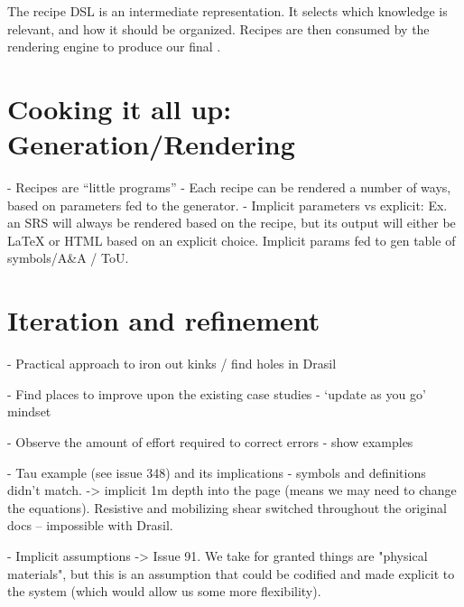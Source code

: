 The recipe DSL is an intermediate representation. It selects which 
knowledge is relevant, and how it should be organized. Recipes are then 
consumed by the rendering engine to produce our final \sfs{}.

\section{Cooking it all up: Generation/Rendering}
\label{sec:gen}
  - Recipes are “little programs”
  - Each recipe can be rendered a number of ways, based on parameters fed to the generator.
  -  Implicit parameters vs explicit: Ex. an SRS will always be rendered based on the recipe, but its output will either be LaTeX or HTML based on an explicit choice. Implicit params fed to gen table of symbols/A\&A / ToU.


\section{Iteration and refinement}

  - Practical approach to iron out kinks / find holes in Drasil

  - Find places to improve upon the existing case studies - ‘update as you go’ 
  mindset

  - Observe the amount of effort required to correct errors - show examples

  - Tau example (see issue 348) and its implications - symbols and definitions 
  didn't match. -> implicit 1m depth into the page (means we may need to change 
  the equations). Resistive and mobilizing shear switched throughout the 
  original docs -- impossible with Drasil.

  -  Implicit assumptions -> 
  Issue 91. We take for granted things are "physical 
  materials", but this is an assumption that could be codified and made 
  explicit to the system (which would allow us some more flexibility).